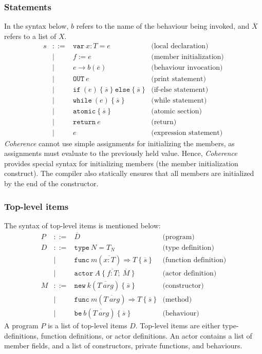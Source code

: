 \subsubsection*{Statements}
In the syntax below, $b$ refers to the name of the behaviour being invoked, and $\overline{X}$ refers to a list of $X$.
\[
\begin{array}{lcll}
s & ::= & \mathtt{var}\ x : T = e\ & \text{(local declaration)} \\
  & \mid & f := e\ & \text{(member initialization)} \\
  & \mid & e \to b(\overline{e})\ & \text{(behaviour invocation)} \\
  & \mid & \mathtt{OUT}\ e\ & \text{(print statement)} \\
  & \mid & \mathtt{if}\ (e)\ \{\ \overline{s}\ \}\ \mathtt{else}\ \{\ \overline{s}\ \} & \text{(if-else statement)} \\
  & \mid & \mathtt{while}\ (e)\ \{\ \overline{s}\ \} & \text{(while statement)} \\
  & \mid & \mathtt{atomic}\ \{\ \overline{s}\ \} & \text{(atomic section)}\\
  & \mid & \mathtt{return}\ e\ & \text{(return)}\\
  & \mid & e\ & \text{(expression statement)}
\end{array}
\]
\textit{Coherence} cannot use simple assignments for initializing the members, as assignments must evaluate to the previously held value. Hence, \textit{Coherence} provides special syntax for initializing members (the member initialization construct). The compiler also statically ensures that all members are initialized by the end of the constructor.

\subsubsection*{Top-level items}
The syntax of top-level items is mentioned below:
\[
\begin{array}{lcll}
P & ::= & \overline{D} & \text{(program)} \\[0.5em]
D & ::= & \mathtt{type}\ N = T_N & \text{(type definition)} \\
  & \mid & \mathtt{func}\ m(\overline{x : T}) \Rightarrow T\ \{\ \overline{s}\ \} & \text{(function definition)} \\
  & \mid & \mathtt{actor}\ A\ \{\ \overline{f : T};\ \overline{M}\ \} & \text{(actor definition)} \\[0.5em]
M & ::= & \mathtt{new}\ k(\overline{T\ \mathit{arg}})\ \{\ \overline{s}\ \} & \text{(constructor)} \\
  & \mid & \mathtt{func}\ m(\overline{T\ \mathit{arg}}) \Rightarrow T\ \{\ \overline{s}\ \} & \text{(method)} \\
  & \mid & \mathtt{be}\ b(\overline{T\ \mathit{arg}})\ \{\ \overline{s}\ \} & \text{(behaviour)}
\end{array}
\]
A program $P$ is a list of top-level items $D$. Top-level items are either type-definitions, function definitions, or actor definitions. An actor contains a list of member fields, and a list of constructors, private functions, and behaviours.

